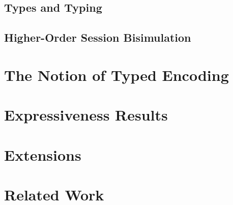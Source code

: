 \documentclass[runningheads]{llncs}
\begin{document}
\subsection{Types and Typing}
\label{sec:types}


\subsection{Higher-Order Session Bisimulation}
\label{sec:behavioural}




\section{The Notion of Typed Encoding}
\label{s:expr}


\section{Expressiveness Results}
\label{sec:positive}


\section{Extensions}
\label{sec:extension}




%

\section{Related Work}
\label{sec:relwork}




%

{}


\newpage
\onecolumn
\appendix 
%
%
%


\end{document}
